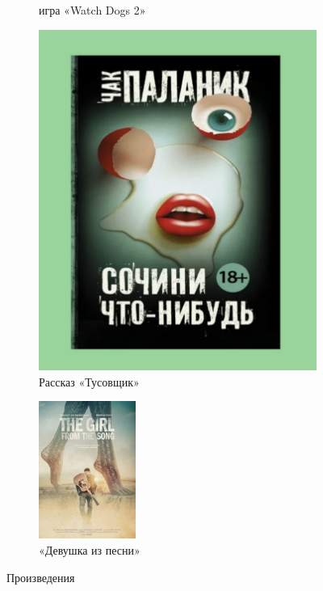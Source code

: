 \documentclass[10pt,a4paper]{report}
\begin{document}
\begin{figure}
\begin{subfigure}[b]{0.3\textwidth}
         \caption{игра «Watch Dogs 2»}
     \end{subfigure}
     \hfill
     \begin{subfigure}[b]{0.3\textwidth}
         \label{pic4}
         \centering
         \includegraphics[width=\textwidth]{images/тусовщик.png}
         \caption{Рассказ «Тусовщик»}
     \end{subfigure}
     \begin{subfigure}[b]{0.3\textwidth}
         \label{pic5}
         \centering
         \includegraphics[height = 4.5cm, width=\textwidth]{images/девушкаизпесни.png}
         \caption{«Девушка из песни»}
     \end{subfigure}
     \caption{Произведения}
\end{figure}
\end{document}
